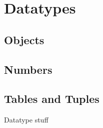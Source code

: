 \section{Datatypes}

\subsection{Objects}

\subsection{Numbers}

\subsection{Tables and Tuples}

Datatype stuff
